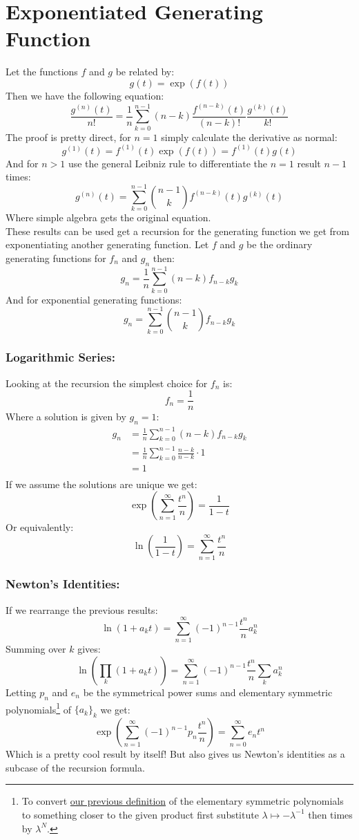 
\section{Exponentiated Generating Function}
Let the functions $f$ and $g$ be related by:
\[g(t) =\exp(f(t))\]
Then we have the following equation:
\[\frac{g^{(n)}(t)}{n!} = \frac{1}{n}\sum_{k=0}^{n-1}(n-k)\frac{f^{(n-k)}(t)}{(n-k)!}\frac{g^{(k)}(t)}{k!}\]
The proof is pretty direct,
for $n=1$ simply calculate the derivative as normal:
\[g^{(1)}(t) = f^{(1)}(t)\exp(f(t))= f^{(1)}(t)g(t)\]
And for $n>1$ use the general Leibniz rule to differentiate the $n=1$ result $n-1$ times:
\[g^{(n)}(t) = \sum_{k=0}^{n-1}\binom{n-1}{k}f^{(n-k)}(t)g^{(k)}(t)\]
Where simple algebra gets the original equation.
\\

These results can be used get a recursion for the generating function we get from exponentiating another generating function.
Let $f$ and $g$ be the ordinary generating functions for $f_n$ and $g_n$ then:
\[g_n = \frac{1}{n}\sum_{k=0}^{n-1}(n-k)f_{n-k}g_k\]
And for exponential generating functions:
\[g_n = \sum_{k=0}^{n-1}\binom{n-1}{k}f_{n-k}g_k\]

\subsubsection{Logarithmic Series:}
Looking at the recursion the simplest choice for $f_n$ is:
\[f_n = \frac{1}{n}\]
Where a solution is given by $g_n = 1$:
\[\begin{aligned}
	g_n &= \frac{1}{n}\sum_{k=0}^{n-1}(n-k)f_{n-k}g_k\\
	&= \frac{1}{n}\sum_{k=0}^{n-1}\frac{n-k}{n-k}\cdot 1\\
	&= 1\\
\end{aligned}\]
If we assume the solutions are unique we get:
\[\exp\left(\sum_{n=1}^\infty\frac{t^n}{n}\right) = \frac{1}{1-t}\]
Or equivalently:
\[\ln\left(\frac{1}{1-t}\right) = \sum_{n=1}^\infty\frac{t^n}{n}\]

\subsubsection{Newton's Identities:}
If we rearrange the previous results:
\[\ln(1+a_kt) = \sum_{n=1}^\infty(-1)^{n-1}\frac{t^n}{n}a_k^n\]
Summing over $k$ gives:
\[\ln\left(\prod_k(1+a_kt)\right) = \sum_{n=1}^\infty(-1)^{n-1}\frac{t^n}{n}\sum_ka_k^n\]
Letting $p_n$ and $e_n$ be the symmetrical power sums and elementary symmetric polynomials\footnote{To convert \hyperref[misc:elementary_symmetric_polynomial_limit]{our previous definition} of the elementary symmetric polynomials to something closer to the given product first substitute $\lambda\mapsto -\lambda^{-1}$ then times by $\lambda^N$.} of $\{a_k\}_k$ we get:
\[\exp\left(\sum_{n=1}^\infty(-1)^{n-1}p_n\frac{t^n}{n}\right) = \sum_{n=0}^\infty e_nt^n\]
Which is a pretty cool result by itself!
But also gives us Newton's identities as a subcase of the recursion formula.

